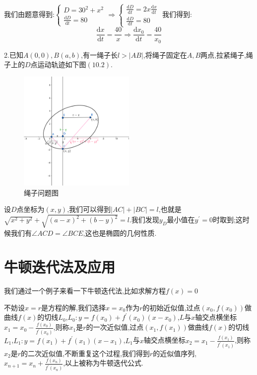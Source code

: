 \documentclass[oneside]{book}
\begin{document}
	我们由题意得到:$\left\{\begin{array}{c}
		D=30^{2}+x^{2}\\\frac{\mathrm{d}D}{\mathrm{d}t}=80
	\end{array}\right.\Rightarrow \left\{\begin{array}{c}
	\frac{\mathrm{d}D}{\mathrm{d}t}=2x\frac{\mathrm{d}x}{\mathrm{d}t}\\\frac{\mathrm{d}D}{\mathrm{d}t}=80
	\end{array}\right.$
	我们得到:
	$$\frac{\mathrm{d}x}{\mathrm{d}t}=\frac{40}{x}\Rightarrow \frac{\mathrm{d}x_{0}}{\mathrm{d}t}=\frac{40}{x_{0}}$$

	2.已知$A(0,0),B(a,b)$,有一绳子长$l>|AB|$,将绳子固定在$A,B$两点,拉紧绳子,绳子上的$D$点运动轨迹如下图$(10.2)$.
	\begin{figure}[htbp]
		\centering
		\includegraphics[width=0.5\textwidth]{picturethree.png}
		\caption{绳子问题图}
	\end{figure}
	设$D$点坐标为$(x,y)$,我们可以得到$|AC|+|BC|=l$,也就是$\sqrt{x^{2}+y^{2}}+\sqrt{(a-x)^{2}+(b-y)^{2}}=l$.我们发现$y_{D}$最小值在$y^{'}=0$时取到;这时候我们有$\angle ACD=\angle BCE$,这也是椭圆的几何性质.
	\chapter{牛顿迭代法及应用}
	我们通过一个例子来看一下牛顿迭代法,比如求解方程$f(x)=0$
	
	不妨设$x=r$是方程的解,我们选择$x=x_{0}$作为$r$的初始近似值,过点$(x_{0},f(x_{0}))$做曲线$f(x)$的切线$L_{0}$,$L_{0}:y=f(x_{0})+f^{'}(x_{0})(x-x_{0})$,$L$与$x$轴交点横坐标$x_{1}=x_{0}-\frac{f(x_{0})}{f^{'}(x_{0})}$,则称$x_{1}$是$r$的一次近似值,过点$(x_{1},f(x_{1}))$做曲线$f(x)$的切线$L_{1}$,$L_{1}:y=f(x_{1})+f^{'}(x_{1})(x-x_{1})$,$L_{1}$与$x$轴交点横坐标$x_{2}=x_{1}-\frac{f(x_{1})}{f^{'}(x_{1})}$,则称$x_{2}$是$r$的二次近似值,不断重复这个过程,我们得到$r$的近似值序列,$x_{n+1}=x_{n}+\frac{f(x_{n})}{f^{'}(x_{n})}$,以上被称为牛顿迭代公式.
	
\end{document}

